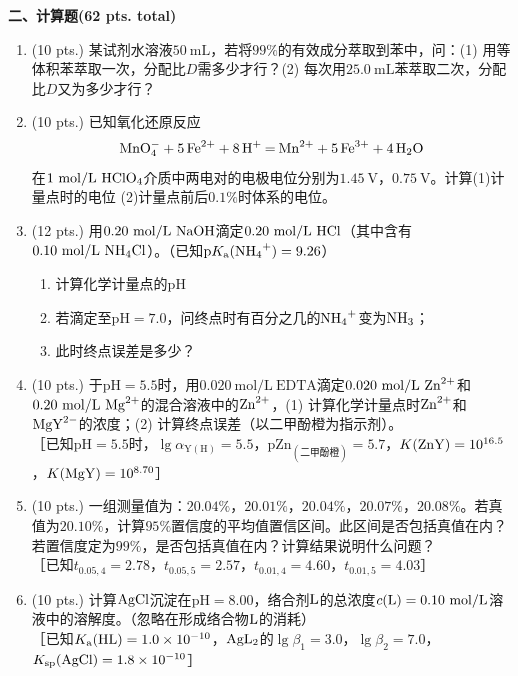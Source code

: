 \vspace{0.5cm}
\noindent\textbf{二、计算题(62 pts. total)}

\begin{enumerate}[label=\arabic*., itemsep=1.5ex]
    \item (10 pts.) 某试剂水溶液$50\ \mathrm{mL}$，若将$99\%$的有效成分萃取到苯中，问：(1) 用等体积苯萃取一次，分配比$D$需多少才行？(2) 每次用$25.0\ \mathrm{mL}$苯萃取二次，分配比$D$又为多少才行？
    \item (10 pts.) 已知氧化还原反应
    \[
    \ce{MnO^-_{4} + 5Fe^{2+} + 8H^{+} = Mn^{2+} + 5Fe^{3+} + 4H_{2}O}
    \]
    在$1\ \mathrm{mol/L}\ \ce{HClO4}$介质中两电对的电极电位分别为$1.45\ \mathrm{V}$，$0.75\ \mathrm{V}$。计算(1)计量点时的电位 (2)计量点前后$0.1\%$时体系的电位。
    \item (12 pts.) 用$0.20\ \mathrm{mol/L}\ \ce{NaOH}$滴定$0.20\ \mathrm{mol/L}\ \ce{HCl}$（其中含有$0.10\ \mathrm{mol/L}\ \ce{NH4Cl}$）。（已知$\mathrm{p}K_\mathrm{a}(\ce{NH4^+})=9.26$）
    \begin{enumerate}[label=(\arabic*), noitemsep, topsep=0pt, partopsep=0pt]
        \item 计算化学计量点的$\mathrm{pH}$
        \item 若滴定至$\mathrm{pH}=7.0$，问终点时有百分之几的$\ce{NH4^+}$变为$\ce{NH3}$；
        \item 此时终点误差是多少？
    \end{enumerate}
    \item (10 pts.) 于$\mathrm{pH}=5.5$时，用$0.020\ \mathrm{mol/L}\ \mathrm{EDTA}$滴定$0.020\ \mathrm{mol/L}\ \ce{Zn^{2+}}$和$0.20\ \mathrm{mol/L}\ \ce{Mg^{2+}}$的混合溶液中的$\ce{Zn^{2+}}$，(1) 计算化学计量点时$\ce{Zn^{2+}}$和$\ce{MgY^{2-}}$的浓度；(2) 计算终点误差（以二甲酚橙为指示剂）。
    \\
    ［已知$\mathrm{pH}=5.5$时，$\lg\alpha_{\mathrm{Y(H)}}=5.5$，$\mathrm{pZn_{(二甲酚橙)}}=5.7$，$K(\ce{ZnY})=10^{16.5}$，$K(\ce{MgY})=10^{8.70}$］
    \item (10 pts.) 一组测量值为：$20.04\%$，$20.01\%$，$20.04\%$，$20.07\%$，$20.08\%$。若真值为$20.10\%$，计算$95\%$置信度的平均值置信区间。此区间是否包括真值在内？若置信度定为$99\%$，是否包括真值在内？计算结果说明什么问题？
    \\
    ［已知$t_{0.05,4}=2.78$，$t_{0.05,5}=2.57$，$t_{0.01,4}=4.60$，$t_{0.01,5}=4.03$］
    \item (10 pts.) 计算$\ce{AgCl}$沉淀在$\mathrm{pH}=8.00$，络合剂$\ce{L}$的总浓度$c(\ce{L})=0.10\ \mathrm{mol/L}$溶液中的溶解度。（忽略在形成络合物$\ce{L}$的消耗）
    \\
    ［已知$K_\mathrm{a}(\ce{HL})=1.0\times10^{-10}$，$\ce{AgL2}$的$\lg\beta_1=3.0$，$\lg\beta_2=7.0$，$K_{\mathrm{sp}}(\ce{AgCl})=1.8\times10^{-10}$］
\end{enumerate}